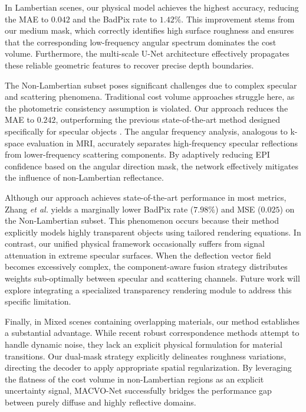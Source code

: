 \documentclass[lettersize,journal]{IEEEtran}
\begin{document}
In Lambertian scenes, our physical model achieves the highest accuracy, reducing the MAE to $0.042$ and the BadPix rate to $1.42\%$. This improvement stems from our medium mask, which correctly identifies high surface roughness and ensures that the corresponding low-frequency angular spectrum dominates the cost volume. Furthermore, the multi-scale U-Net architecture \cite{ronneberger2015} effectively propagates these reliable geometric features to recover precise depth boundaries.

The Non-Lambertian subset poses significant challenges due to complex specular and scattering phenomena. Traditional cost volume approaches struggle here, as the photometric consistency assumption is violated. Our approach reduces the MAE to $0.242$, outperforming the previous state-of-the-art method designed specifically for specular objects \cite{zhang2023}. The angular frequency analysis, analogous to k-space evaluation in MRI, accurately separates high-frequency specular reflections from lower-frequency scattering components. By adaptively reducing EPI confidence based on the angular direction mask, the network effectively mitigates the influence of non-Lambertian reflectance.

Although our approach achieves state-of-the-art performance in most metrics, Zhang \textit{et al.} \cite{zhang2023} yields a marginally lower BadPix rate ($7.98\%$) and MSE ($0.025$) on the Non-Lambertian subset. This phenomenon occurs because their method explicitly models highly transparent objects using tailored rendering equations. In contrast, our unified physical framework occasionally suffers from signal attenuation in extreme specular surfaces. When the deflection vector field becomes excessively complex, the component-aware fusion strategy distributes weights sub-optimally between specular and scattering channels. Future work will explore integrating a specialized transparency rendering module to address this specific limitation.

Finally, in Mixed scenes containing overlapping materials, our method establishes a substantial advantage. While recent robust correspondence methods \cite{wang2023} attempt to handle dynamic noise, they lack an explicit physical formulation for material transitions. Our dual-mask strategy explicitly delineates roughness variations, directing the decoder to apply appropriate spatial regularization. By leveraging the flatness of the cost volume in non-Lambertian regions as an explicit uncertainty signal, MACVO-Net successfully bridges the performance gap between purely diffuse and highly reflective domains.
\end{document}
